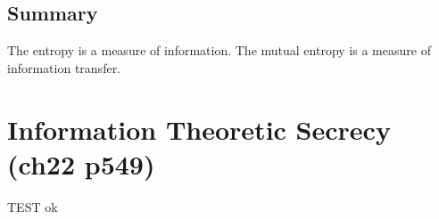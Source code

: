 \documentclass[11pt]{article}
\begin{document}
 \subsection{Summary}
 The entropy is a measure of information. The mutual entropy is a measure of information transfer.

\section{Information Theoretic Secrecy (ch22 p549)}

TEST ok 





\end{document}
